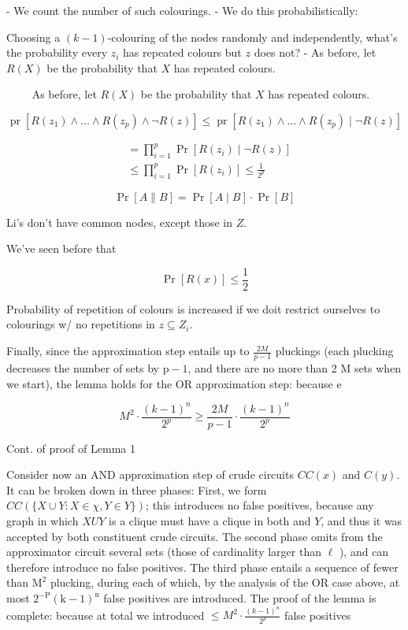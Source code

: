 - We count the number of such colourings.
- We do this probabilistically:

Choosing a $(k-1)$-colouring of the nodes randomly and independently, what's the probability every $z_i$ has repeated colours but $z$ does not?
- As before, let $R(X)$ be the probability that $X$ has repeated colours.


$\qquad$ As before, let $R(X)$ be the probability that $X$ has repeated colours.

$$
\operatorname{pr}\left[R\left(z_1\right) \wedge \ldots \wedge R\left(z_p\right) \wedge \neg R(z)\right] \leqslant \operatorname{pr}\left[R\left(z_1\right) \wedge \ldots \wedge R\left(z_p\right) \mid \neg R(z)\right]$$

$$
\begin{aligned}
& =\prod_{i=1}^p \operatorname{Pr}\left[R\left(z_i\right) \mid \neg R(z)\right] \\
& \leqslant \prod_{i=1}^p \operatorname{Pr}\left[R\left(z_i\right)\right]
\leqslant \frac{1}{2^p}
\end{aligned}
$$

$$
\operatorname{Pr}[A \| B]=\operatorname{Pr}[A \mid B] \cdot \operatorname{Pr}[B]
$$


Li's don't have common nodes, except those in $Z$.

We've seen before that

$$
\operatorname{Pr}[R(x)] \leqslant \frac{1}{2}
$$

Probability of repetition of colours is increased if we doit restrict ourselves to colourings w/ no repetitions in $z \subseteq Z_i$.


Finally, since the approximation step entails up to $\frac{2 M}{p-1}$ pluckings (each plucking decreases the number of sets by $\mathrm{p}-1$, and there are no more than 2 M sets when we start), the lemma holds for the OR approximation step: because e

$$
M^2 \cdot \frac{(k-1)^n}{2^p} \geq \frac{2 M}{p-1} \cdot \frac{(k-1)^n}{2^p}
$$


Cont. of proof of Lemma 1

Consider now an AND approximation step of crude circuits $C C(x)$ and $C(y)$. It can be broken down in three phases: First, we form $C C(\{X \cup Y: X \in \chi, Y \in Y\})$; this introduces no false positives, because any graph in which $X U Y$ is a clique must have a clique in both and $Y$, and thus it was accepted by both constituent crude circuits. The second phase omits from the approximator circuit several sets (those of cardinality larger than $\ell$ ), and can therefore introduce no false positives. The third phase entails a sequence of fewer than $\mathrm{M}^2$ plucking, during each of which, by the analysis of the OR case above, at most $2^{-\mathrm{P}}(\mathrm{k}-1)^{\mathrm{n}}$ false positives are introduced. The proof of the lemma is complete: because at total we introduced $\leq M^2 \cdot \frac{(k-1)^n}{2^p}$ false positives




